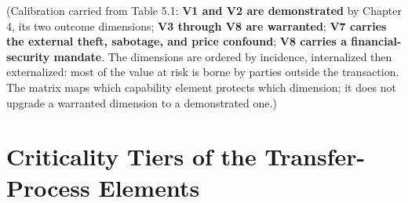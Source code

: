\documentclass[twoside,fontset=lmodern]{mitthesis}
\begin{document}
(Calibration carried from Table 5.1: \textbf{V1 and V2 are demonstrated}
by Chapter 4, its two outcome dimensions; \textbf{V3 through V8 are
warranted}; \textbf{V7 carries the external theft, sabotage, and price
confound}; \textbf{V8 carries a financial-security mandate}. The
dimensions are ordered by incidence, internalized then externalized:
most of the value at risk is borne by parties outside the transaction.
The matrix maps which capability element protects which dimension; it
does not upgrade a warranted dimension to a demonstrated one.)

\hypertarget{criticality-tiers-of-the-transfer-process-elements}{%
\section{Criticality Tiers of the Transfer-Process
Elements}\label{criticality-tiers-of-the-transfer-process-elements}}
\end{document}
